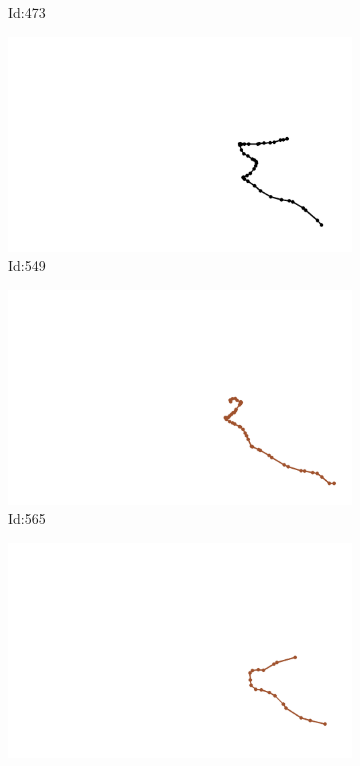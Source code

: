 \documentclass[12pt,twoside]{report}
\begin{document}
\begin{figure}
\begin{subfigure}[b]{0.20\textwidth}
\caption{Id:473}
\end{subfigure}
\begin{subfigure}[b]{0.20\textwidth}
\centering
\includegraphics[width=\textwidth]{../trajectories/549.png}
\caption{Id:549}
\end{subfigure}
\begin{subfigure}[b]{0.20\textwidth}
\centering
\includegraphics[width=\textwidth]{../trajectories/565.png}
\caption{Id:565}
\end{subfigure}
\begin{subfigure}[b]{0.20\textwidth}
\centering
\includegraphics[width=\textwidth]{../trajectories/579.png}

\end{subfigure}
\end{figure}
\end{document}
